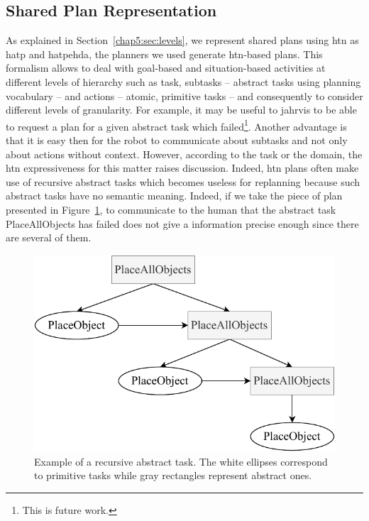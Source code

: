\documentclass[a4paper,11pt,twoside]{StyleThese}
\begin{document}
\subsection{Shared Plan Representation}\label{chap6:subsec:shared_p_rep}
As explained in Section~\ref{chap5:sec:levels}, we represent shared plans using \acrfull{htn} as \acrshort{hatp} and \acrshort{hatpehda}, the planners we used generate \acrshort{htn}-based plans. This formalism allows to deal with goal-based and situation-based activities at different levels of hierarchy such as task, subtasks -- abstract tasks using planning vocabulary -- and actions -- atomic, primitive tasks -- and consequently to consider different levels of granularity. For example, it may be useful to \acrshort{jahrvis} to be able to request a plan for a given abstract task which failed\footnote{This is future work.}. Another advantage is that it is easy then for the robot to communicate about subtasks and not only about actions without context. However, according to the task or the domain, the \acrshort{htn} expressiveness for this matter raises discussion. Indeed, \acrshort{htn} plans often make use of recursive abstract tasks which becomes useless for replanning because such abstract tasks have no semantic meaning. Indeed, if we take the piece of plan presented in Figure~\ref{chap6:fig:recursive_task}, to communicate to the human that the abstract task PlaceAllObjects has failed does not give a information precise enough since there are several of them.

\begin{figure}[!ht]
	\centering
	\includegraphics[width=0.6\linewidth]{figures/chapter2/recursive_task.pdf}
	\caption{Example of a recursive abstract task. The white ellipses correspond to primitive tasks while gray rectangles represent abstract ones.}
	\label{chap6:fig:recursive_task}
\end{figure}
\end{document}
